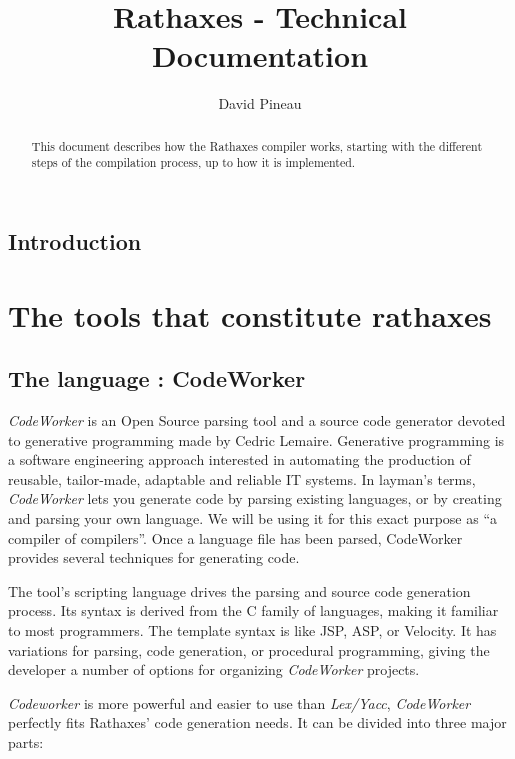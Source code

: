 \documentclass{rtxreport}
\author{David Pineau}
\title{Rathaxes - Technical Documentation}
\begin{document}
\maketitle

\rtxmaketitleblock

\tableofcontents

\begin{abstract}
    This document describes how the Rathaxes compiler works, starting with the
    different steps of the compilation process, up to how it is implemented.
\end{abstract}


\section*{Introduction}



\chapter{The tools that constitute rathaxes}

\section{The language : CodeWorker}

\emph{CodeWorker} is an Open Source parsing tool and a source code generator
devoted to generative programming made by Cedric Lemaire. Generative
programming is a software engineering approach interested in automating the
production of reusable, tailor-made, adaptable and reliable IT systems. In
layman's terms, \emph{CodeWorker} lets you generate code by parsing existing
languages, or by creating and parsing your own language. We will be using it
for this exact purpose as ``a compiler of compilers''. Once a language file has
been parsed, CodeWorker provides several techniques for generating code.

The tool's scripting language drives the parsing and source code generation
process. Its syntax is derived from the C family of languages, making it
familiar to most programmers. The template syntax is like JSP, ASP, or
Velocity. It has variations for parsing, code generation, or procedural
programming, giving the developer a number of options for organizing
\emph{CodeWorker} projects. 

\emph{Codeworker} is more powerful and easier to use than \emph{Lex/Yacc},
\emph{CodeWorker} perfectly fits Rathaxes' code generation needs. It can be
divided into three major parts:
\end{document}
